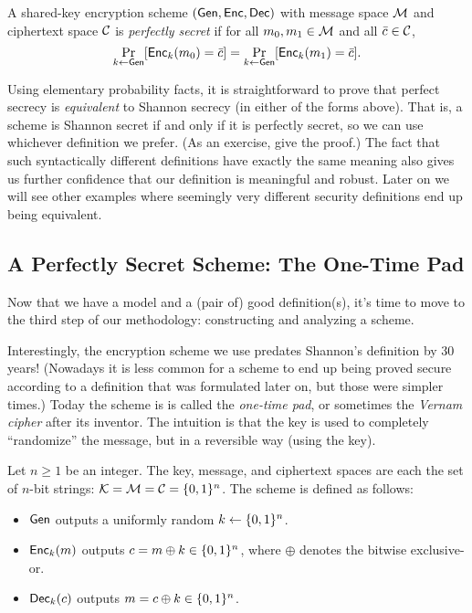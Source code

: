 \documentclass[11pt]{article}
\begin{document}
\begin{definition}
  \label{def:perfect-secrecy}
  A shared-key encryption scheme $(\mathsf{Gen},\mathsf{Enc},\mathsf{Dec})$ with
  message space $\mathcal{M}$ and ciphertext space $\mathcal{C}$ is
  \emph{perfectly secret} if for all $m_{0}, m_{1} \in \mathcal{M}$ and
  all $\bar{c} \in \mathcal{C}$,
  \begin{equation}
    \label{eq:perfect}
    \Pr_{k \gets \mathsf{Gen}}[\mathsf{Enc}_{k}(m_{0}) = \bar{c}] = \Pr_{k \gets
      \mathsf{Gen}}[\mathsf{Enc}_{k}(m_{1}) = \bar{c}].
  \end{equation}
\end{definition}

Using elementary probability facts, it is straightforward to prove
that perfect secrecy is \emph{equivalent} to Shannon secrecy (in
either of the forms above).  That is, a scheme is Shannon secret if
and only if it is perfectly secret, so we can use whichever definition
we prefer.  (As an exercise, give the proof.)  The fact that such
syntactically different definitions have exactly the same meaning also
gives us further confidence that our definition is meaningful and
robust.  Later on we will see other examples where seemingly very
different security definitions end up being equivalent.

\subsection{A Perfectly Secret Scheme: The One-Time Pad}
\label{sec:one-time-pad}

Now that we have a model and a (pair of) good definition(s), it's time
to move to the third step of our methodology: constructing and
analyzing a scheme.

Interestingly, the encryption scheme we use predates Shannon's
definition by 30 years!  (Nowadays it is less common for a scheme to
end up being proved secure according to a definition that was
formulated later on, but those were simpler times.)  Today the scheme
is is called the \emph{one-time pad}, or sometimes the \emph{Vernam
  cipher} after its inventor.  The intuition is that the key is used
to completely ``randomize'' the message, but in a reversible way
(using the key).

\begin{definition}
  Let $n \geq 1$ be an integer.  The key, message, and ciphertext
  spaces are each the set of $n$-bit strings: $\mathcal{K} = \mathcal{M} =
  \mathcal{C} = \{0,1\}^{n}$.  The scheme is defined as follows:
  \begin{itemize}
  \item $\mathsf{Gen}$ outputs a uniformly random $k \gets \{0,1\}^{n}$.
  \item $\mathsf{Enc}_{k}(m)$ outputs $c = m \oplus k \in \{0,1\}^{n}$, where
    $\oplus$ denotes the bitwise exclusive-or.
  \item $\mathsf{Dec}_{k}(c)$ outputs $m = c \oplus k \in \{0,1\}^{n}$.
  \end{itemize}
\end{definition}
\end{document}
